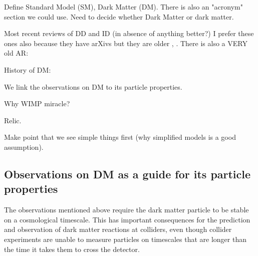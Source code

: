 Define Standard Model (SM), Dark Matter (DM). There is also an "acronym" section we could use. 
Need to decide whether Dark Matter or dark matter.

Most recent reviews of DD and ID (in absence of anything better?)
\cite{DMDD_NaturePhysics}
\cite{DMID_NaturePhysics}
I prefer these ones also because they have arXivs but they are older \cite{Gaskins:2016cha}, \cite{0954-3899-43-1-013001}. There is also a VERY old AR: \cite{doi:10.1146/annurev.nucl.54.070103.181244}

History of DM: ~\cite{Bertone:2016nfn}



We link the observations on DM to its particle properties.

Why WIMP miracle?

Relic. 

Make point that we see simple things first (why simplified models is a good assumption). 

\subsection{Observations on DM as a guide for its particle properties}
\label{sec:DMObservations}


The observations mentioned above require the dark matter particle to be stable on a cosmological timescale. This has important consequences for the prediction and observation of dark matter reactions at colliders, even though collider experiments are unable to measure particles on timescales that are longer than the time it takes them to cross the detector. 

\begin{marginnote}[]
\end{marginnote}

